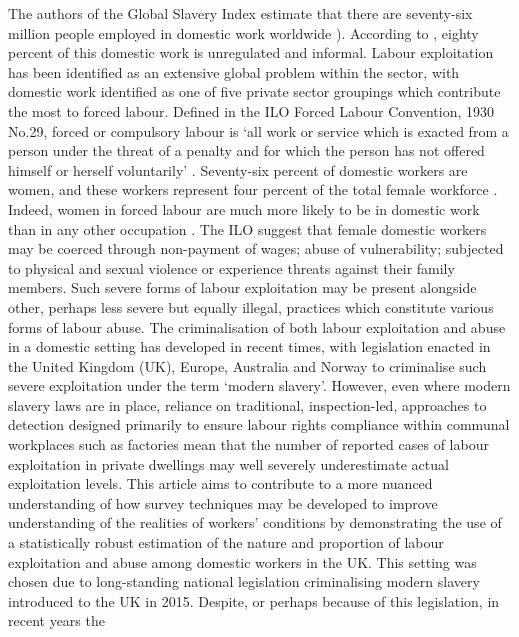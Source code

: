 \documentclass[
  12pt,
  letterpaper,
  DIV=11,
  numbers=noendperiod]{scrartcl}
\theoremstyle{plain}
\theoremstyle{definition}
\begin{document}
The authors of the Global Slavery Index estimate that there are
seventy-six million people employed in domestic work worldwide
\autocite{international_labour_organization_global_2022}).
According to \textcite{bonnet_domestic_2022}, eighty percent of this domestic work is unregulated and informal. Labour
exploitation has been identified as an extensive global problem within
the sector, with domestic work identified as one of five private sector
groupings which contribute the most to forced labour. Defined in the ILO
Forced Labour Convention, 1930 No.29, forced or compulsory labour is
`all work or service which is exacted from a person under the threat of
a penalty and for which the person has not offered himself or herself
voluntarily' \autocite{ilo_what_2024}. Seventy-six
percent of domestic workers are women, and these workers represent four
percent of the total female workforce \autocite{international_labour_organization_global_2022}. Indeed, women in forced labour are much more likely to be in domestic
work than in any other occupation \autocite{international_labour_organization_global_2022}.
The ILO suggest that female domestic workers may be coerced through
non-payment of wages; abuse of vulnerability; subjected to physical and
sexual violence or experience threats against their family members. Such
severe forms of labour exploitation may be present alongside other,
perhaps less severe but equally illegal, practices which constitute
various forms of labour abuse. The criminalisation of both labour
exploitation and abuse in a domestic setting has developed in recent
times, with legislation enacted in the United Kingdom (UK), Europe,
Australia and Norway to criminalise such severe exploitation under the
term `modern slavery'. However, even where modern slavery laws are in
place, reliance on traditional, inspection-led, approaches to detection
designed primarily to ensure labour rights compliance within communal
workplaces such as factories mean that the number of reported cases of
labour exploitation in private dwellings may well severely underestimate
actual exploitation levels. This article aims to contribute to a more
nuanced understanding of how survey techniques may be developed to
improve understanding of the realities of workers' conditions by
demonstrating the use of a statistically robust estimation of the nature
and proportion of labour exploitation and abuse among domestic workers
in the UK. This setting was chosen due to long-standing national
legislation criminalising modern slavery introduced to the UK in 2015.
Despite, or perhaps because of this legislation, in recent years the
\end{document}
